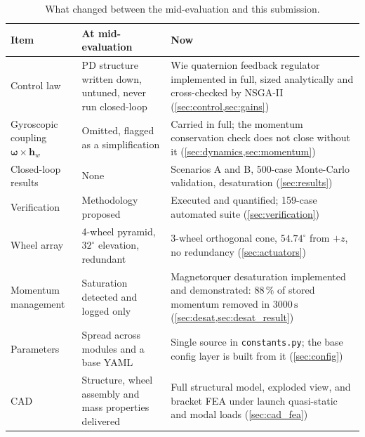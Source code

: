 \documentclass[conference,10pt,a4paper]{IEEEtran}
\newcommand{\vect}[1]{\bm{#1}}
\newcommand{\unit}[1]{\ensuremath{\,\mathrm{#1}}}
\begin{document}
\begin{table}[!t]
\centering
\caption{What changed between the mid-evaluation and this submission.}
\label{tab:whatchanged}
\footnotesize
\begin{tabularx}{\textwidth}{@{}p{}p{}X@{}}
\toprule
\textbf{Item} & \textbf{At mid-evaluation} & \textbf{Now} \\
\midrule
Control law &
PD structure written down, untuned, never run closed-loop &
Wie quaternion feedback regulator implemented in full, sized analytically and
cross-checked by NSGA-II (\cref{sec:control,sec:gains}) \\[3pt]

Gyroscopic coupling $\vect{\omega}\times\vect{h}_w$ &
Omitted, flagged as a simplification &
Carried in full; the momentum conservation check does not close without it
(\cref{sec:dynamics,sec:momentum}) \\[3pt]

Closed-loop results &
None &
Scenarios A and B, 500-case Monte-Carlo validation, desaturation
(\cref{sec:results}) \\[3pt]

Verification &
Methodology proposed &
Executed and quantified; 159-case automated suite (\cref{sec:verification}) \\[3pt]

Wheel array &
4-wheel pyramid, $32^\circ$ elevation, redundant &
3-wheel orthogonal cone, $54.74^\circ$ from $+z$, no redundancy
(\cref{sec:actuators}) \\[3pt]

Momentum management &
Saturation detected and logged only &
Magnetorquer desaturation implemented and demonstrated: $88\,\%$ of stored
momentum removed in $3000\unit{s}$ (\cref{sec:desat,sec:desat_result}) \\[3pt]

Parameters &
Spread across modules and a base YAML &
Single source in \texttt{constants.py}; the base config layer is built from it
(\cref{sec:config}) \\[3pt]

CAD &
Structure, wheel assembly and mass properties delivered &
Full structural model, exploded view, and bracket FEA under launch
quasi-static and modal loads (\cref{sec:cad_fea}) \\
\bottomrule
\end{tabularx}
\end{table}
\end{document}
